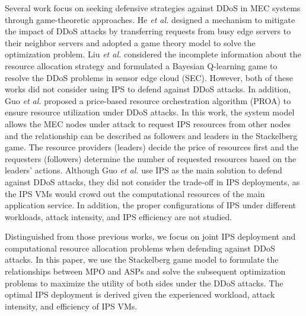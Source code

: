 \documentclass[10pt,journal, compsoc]{IEEEtran}
\begin{document}
Several work focus on seeking defensive strategies against DDoS in MEC systems through game-theoretic approaches. He \emph{et al.} designed a mechanism to mitigate the impact of DDoS attacks by transferring requests from busy edge servers to their neighbor servers and adopted a game theory model to solve the optimization problem\cite{He}. Liu \emph{et al.} considered the incomplete information about the resource allocation strategy and formulated a Bayesian Q-learning game to resolve the DDoS problems in sensor edge cloud (SEC)\cite{Liu3}. However, both of these works did not consider using IPS to defend against DDoS attacks. In addition, Guo \emph{et al.} proposed a price-based resource orchestration algorithm (PROA) to ensure resource utilization under DDoS attacks\cite{Guo2}. In this work, the system model allows the MEC nodes under attack to request IPS resources from other nodes and the relationship can be described as followers and leaders in the Stackelberg game. The resource providers (leaders) decide the price of resources first and the requesters (followers) determine the number of requested resources based on the leaders' actions. Although Guo \emph{et al.} use IPS as the main solution to defend against DDoS attacks, they did not consider the trade-off in IPS deployments, as the IPS VMs would crowd out the computational resources of the main application service. In addition, the proper configurations of IPS under different workloads, attack intensity, and IPS efficiency are not studied.

Distinguished from those previous works, we focus on joint IPS deployment and computational resource allocation problems when defending against DDoS attacks. In this paper, we use the Stackelberg game model to formulate the relationships between MPO and ASPs and solve the subsequent optimization problems to maximize the utility of both sides under the DDoS attacks. The optimal IPS deployment is derived given the experienced workload, attack intensity, and efficiency of IPS VMs.
\end{document}
